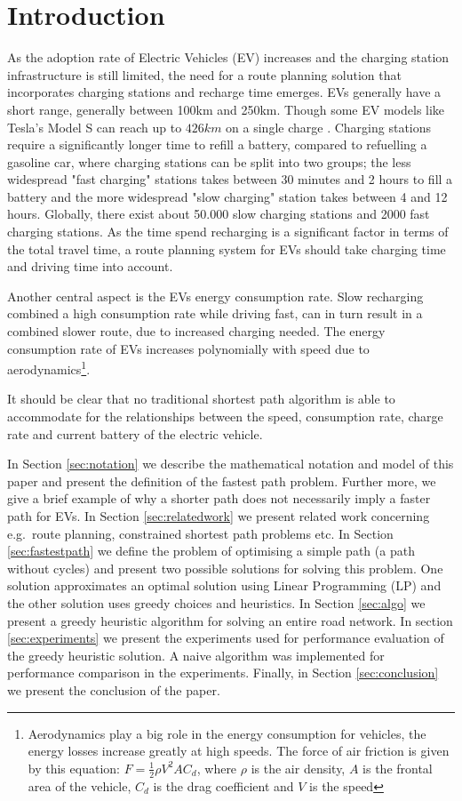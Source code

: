 \section{Introduction}

As the adoption rate of Electric Vehicles (EV) increases \cite{Henry2013} and the charging station infrastructure is still limited, the need for a route planning solution that incorporates charging stations and recharge time emerges. EVs generally have a short range, generally between 100km and 250km. Though some EV models like Tesla's Model S can reach up to $426\si{km}$ on a single charge \cite{teslacon}. Charging stations require a significantly longer time to refill a battery, compared to refuelling a gasoline car, where charging stations can be split into two groups; the less widespread "fast charging" stations takes between 30 minutes and 2 hours to fill a battery and the more widespread "slow charging" station takes between 4 and 12 hours. Globally, there exist about 50.000 slow charging stations and 2000 fast charging stations\cite{Globalevoutlook}. As the time spend recharging is a significant factor in terms of the total travel time, a route planning system for EVs should take charging time and driving time into account.

Another central aspect is the EVs energy consumption rate. Slow recharging combined a high consumption rate while driving fast, can in turn result in a combined slower route, due to increased charging needed. The energy consumption rate of EVs increases polynomially with speed due to aerodynamics\footnote{Aerodynamics play a big role in the energy consumption for vehicles, the energy losses increase greatly at high speeds. The force of air friction is given by this equation: $F = \frac{1}{2} \rho V^2 A C_d$, where $\rho$ is the air density, $A$ is the frontal area of the vehicle, $C_d$ is the drag coefficient and $V$ is the speed}.

It should be clear that no traditional shortest path algorithm is able to accommodate for the relationships between the speed, consumption rate, charge rate and current battery of the electric vehicle. 

In Section \ref{sec:notation} we describe the mathematical notation and model of this paper and present the definition of the fastest path problem. Further more, we give a brief example of why a shorter path does not necessarily imply a faster path for EVs. In Section \ref{sec:relatedwork} we present related work concerning e.g.\ route planning, constrained shortest path problems etc. In Section \ref{sec:fastestpath} we define the problem of optimising a simple path (a path without cycles) and present two possible solutions for solving this problem. One solution approximates an optimal solution using Linear Programming (LP) and the other solution uses greedy choices and heuristics. In Section \ref{sec:algo} we present a greedy heuristic algorithm for solving an entire road network. In section \ref{sec:experiments} we present the experiments used for performance evaluation of the greedy heuristic solution. A naive algorithm was implemented for performance comparison in the experiments. Finally, in Section \ref{sec:conclusion} we present the conclusion of the paper.    

